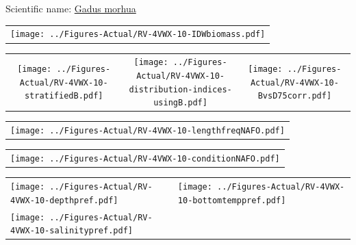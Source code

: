 \documentclass[12pt]{article}\usepackage[]{graphicx}\usepackage[]{color}
\begin{document}
  


Scientific name: \href{http://www.marinespecies.org/aphia.php?p=taxdetails\&id=126436}{Gadus morhua} \newline
\begin{minipage}{1.0\textwidth}
 \begin{tabular}{c}
\texttt{[image: ../Figures-Actual/RV-4VWX-10-IDWbiomass.pdf]} \\ 
\end{tabular} 
\end{minipage}
\newline

\vspace{1cm}
\begin{minipage}{1.0\textwidth}
 \begin{tabular}{ccc}
\texttt{[image: ../Figures-Actual/RV-4VWX-10-stratifiedB.pdf]} & 
\texttt{[image: ../Figures-Actual/RV-4VWX-10-distribution-indices-usingB.pdf]} & 
\texttt{[image: ../Figures-Actual/RV-4VWX-10-BvsD75corr.pdf]} \\ 
\end{tabular} 
\end{minipage}
\clearpage
\begin{minipage}{1.0\textwidth}
 \begin{tabular}{c}
\texttt{[image: ../Figures-Actual/RV-4VWX-10-lengthfreqNAFO.pdf]} \\ 
\end{tabular} 
\end{minipage}
\newline

\vspace{1cm}
\begin{minipage}{1.0\textwidth}
 \begin{tabular}{c}
\texttt{[image: ../Figures-Actual/RV-4VWX-10-conditionNAFO.pdf]} \\ 
\end{tabular} 
\end{minipage}
\clearpage
\begin{minipage}{1.0\textwidth}
 \begin{tabular}[t]{m{3in}m{3in}}
\texttt{[image: ../Figures-Actual/RV-4VWX-10-depthpref.pdf]} & 
\texttt{[image: ../Figures-Actual/RV-4VWX-10-bottomtemppref.pdf]} \\ 
\texttt{[image: ../Figures-Actual/RV-4VWX-10-salinitypref.pdf]} & 
 \\ 
\end{tabular} 
\end{minipage}
\newline
\end{document}

